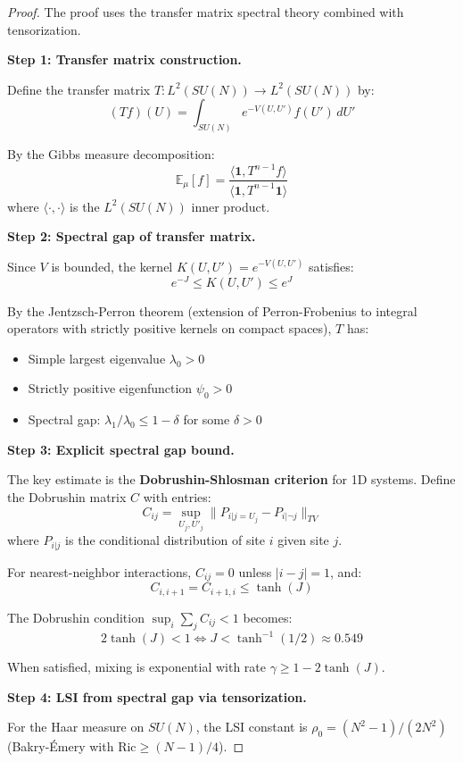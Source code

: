 \begin{proof}
The proof uses the transfer matrix spectral theory combined with tensorization.

\textbf{Step 1: Transfer matrix construction.}

Define the transfer matrix $T: L^2(SU(N)) \to L^2(SU(N))$ by:
\[
(Tf)(U) = \int_{SU(N)} e^{-V(U,U')} f(U') \, dU'
\]

By the Gibbs measure decomposition:
\[
\mathbb{E}_\mu[f] = \frac{\langle \mathbf{1}, T^{n-1} f \rangle}{\langle \mathbf{1}, T^{n-1} \mathbf{1} \rangle}
\]
where $\langle \cdot, \cdot \rangle$ is the $L^2(SU(N))$ inner product.

\textbf{Step 2: Spectral gap of transfer matrix.}

Since $V$ is bounded, the kernel $K(U,U') = e^{-V(U,U')}$ satisfies:
\[
e^{-J} \leq K(U,U') \leq e^{J}
\]

By the Jentzsch-Perron theorem (extension of Perron-Frobenius to integral operators 
with strictly positive kernels on compact spaces), $T$ has:
\begin{itemize}
\item Simple largest eigenvalue $\lambda_0 > 0$
\item Strictly positive eigenfunction $\psi_0 > 0$
\item Spectral gap: $\lambda_1/\lambda_0 \leq 1 - \delta$ for some $\delta > 0$
\end{itemize}

\textbf{Step 3: Explicit spectral gap bound.}

The key estimate is the \textbf{Dobrushin-Shlosman criterion} for 1D systems.
Define the Dobrushin matrix $C$ with entries:
\[
C_{ij} = \sup_{U_j, U'_j} \|P_{i|j=U_j} - P_{i|\neg j}\|_{TV}
\]
where $P_{i|j}$ is the conditional distribution of site $i$ given site $j$.

For nearest-neighbor interactions, $C_{ij} = 0$ unless $|i-j| = 1$, and:
\[
C_{i,i+1} = C_{i+1,i} \leq \tanh(J)
\]

The Dobrushin condition $\sup_i \sum_j C_{ij} < 1$ becomes:
\[
2\tanh(J) < 1 \Leftrightarrow J < \tanh^{-1}(1/2) \approx 0.549
\]

When satisfied, mixing is exponential with rate $\gamma \geq 1 - 2\tanh(J)$.

\textbf{Step 4: LSI from spectral gap via tensorization.}

For the Haar measure on $SU(N)$, the LSI constant is $\rho_0 = (N^2-1)/(2N^2)$ 
(Bakry-Émery with $\mathrm{Ric} \geq (N-1)/4$).


\end{proof}
